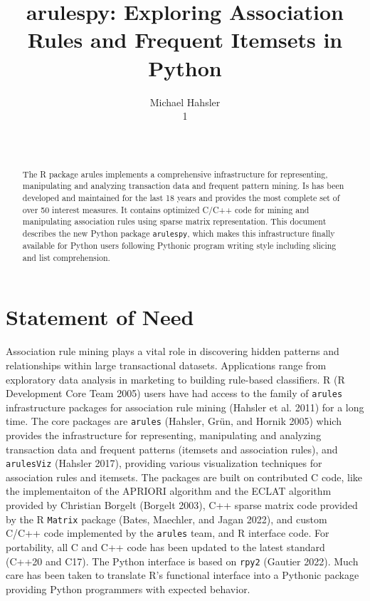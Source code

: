 \documentclass{article}
\title{arulespy: Exploring Association Rules and Frequent Itemsets in
Python}
\author{
    Michael Hahsler
   \\
    1 \\
   \\
  \texttt{} \\
  }
\begin{document}
\maketitle


\begin{abstract}
The R package arules implements a comprehensive infrastructure for
representing, manipulating and analyzing transaction data and frequent
pattern mining. Is has been developed and maintained for the last 18
years and provides the most complete set of over 50 interest measures.
It contains optimized C/C++ code for mining and manipulating association
rules using sparse matrix representation. This document describes the
new Python package \texttt{arulespy}, which makes this infrastructure
finally available for Python users following Pythonic program writing
style including slicing and list comprehension.
\end{abstract}


\hypertarget{statement-of-need}{%
\section{Statement of Need}\label{statement-of-need}}

Association rule mining plays a vital role in discovering hidden
patterns and relationships within large transactional datasets.
Applications range from exploratory data analysis in marketing to
building rule-based classifiers. R (R Development Core Team 2005) users
have had access to the family of \texttt{arules} infrastructure packages
for association rule mining (Hahsler et al. 2011) for a long time. The
core packages are \texttt{arules} (Hahsler, Grün, and Hornik 2005) which
provides the infrastructure for representing, manipulating and analyzing
transaction data and frequent patterns (itemsets and association rules),
and \texttt{arulesViz} (Hahsler 2017), providing various visualization
techniques for association rules and itemsets. The packages are built on
contributed C code, like the implementaiton of the APRIORI algorithm and
the ECLAT algorithm provided by Christian Borgelt (Borgelt 2003), C++
sparse matrix code provided by the R \texttt{Matrix} package (Bates,
Maechler, and Jagan 2022), and custom C/C++ code implemented by the
\texttt{arules} team, and R interface code. For portability, all C and
C++ code has been updated to the latest standard (C++20 and C17). The
Python interface is based on \texttt{rpy2} (Gautier 2022). Much care has
been taken to translate R's functional interface into a Pythonic package
providing Python programmers with expected behavior.
\end{document}
